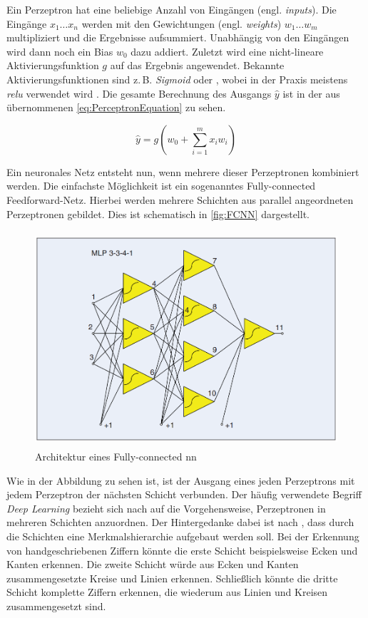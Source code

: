 Ein Perzeptron hat eine beliebige Anzahl von Eingängen (engl. \emph{inputs}).
Die Eingänge $x_1 \dots x_n$ werden mit den Gewichtungen (engl. \emph{weights}) $w_1 \dots w_m$ multipliziert und die Ergebnisse aufsummiert.
Unabhängig von den Eingängen wird dann noch ein Bias $w_0$ dazu addiert.
Zuletzt wird eine nicht-lineare Aktivierungsfunktion $g$ auf das Ergebnis angewendet.
Bekannte Aktivierungsfunktionen sind z.\,B. \emph{Sigmoid} oder \emph{}, wobei in der Praxis meistens \emph{\acrshort{relu}} verwendet wird \cite{ActivFuncSharma,ActivFuncNwankpa}.
Die gesamte Berechnung des Ausgangs $\hat{y}$ ist in der aus \cite{6S191Intro} übernommenen \autoref{eq:PerceptronEquation} zu sehen.

\begin{equation}
    \hat{y} = g\left(w_0 + \sum_{i=1}^{m} x_i w_i \right)  
\label{eq:PerceptronEquation}
\end{equation}

Ein neuronales Netz entsteht nun, wenn mehrere dieser Perzeptronen kombiniert werden.
Die einfachste Möglichkeit ist ein sogenanntes Fully-connected Feedforward-Netz.
Hierbei werden mehrere Schichten aus parallel angeordneten Perzeptronen gebildet.
Dies ist schematisch in \autoref{fig:FCNN} dargestellt.

\begin{figure}[h]
    \centering
    \includegraphics[width=1\textwidth,height=8cm,keepaspectratio=true]{content/images/FCNN.png}
    \caption{Architektur eines Fully-connected \acrshort{nn} \cite[FIGURE 1]{NNArchitectures}}
    \label{fig:FCNN}
\end{figure}

Wie in der Abbildung zu sehen ist, ist der Ausgang eines jeden Perzeptrons mit jedem Perzeptron der nächsten Schicht verbunden.
Der häufig verwendete Begriff \emph{Deep Learning} bezieht sich nach \cite[S. 27]{DeepLearningPythonKeras} auf die Vorgehensweise, Perzeptronen in mehreren Schichten anzuordnen.
Der Hintergedanke dabei ist nach \cite{6S191Intro}, dass durch die Schichten eine Merkmalshierarchie aufgebaut werden soll.
Bei der Erkennung von handgeschriebenen Ziffern könnte die erste Schicht beispielsweise Ecken und Kanten erkennen.
Die zweite Schicht würde aus Ecken und Kanten zusammengesetzte Kreise und Linien erkennen.
Schließlich könnte die dritte Schicht komplette Ziffern erkennen, die wiederum aus Linien und Kreisen zusammengesetzt sind.

